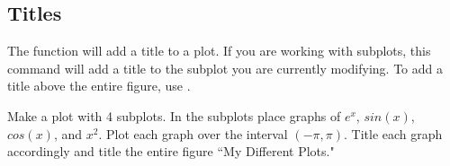 \subsection*{Titles}

The function  will add a title to a plot.
If you are working with subplots, this command will add a title to the subplot you are currently modifying.
To add a title above the entire figure, use .

\begin{problem}
Make a plot with 4 subplots.
In the subplots place graphs of $e^x$, $sin(x)$, $cos(x)$, and $x^2$.
Plot each graph over the interval $(-\pi,\pi)$.
Title each graph accordingly and title the entire figure ``My Different Plots."
\end{problem}

